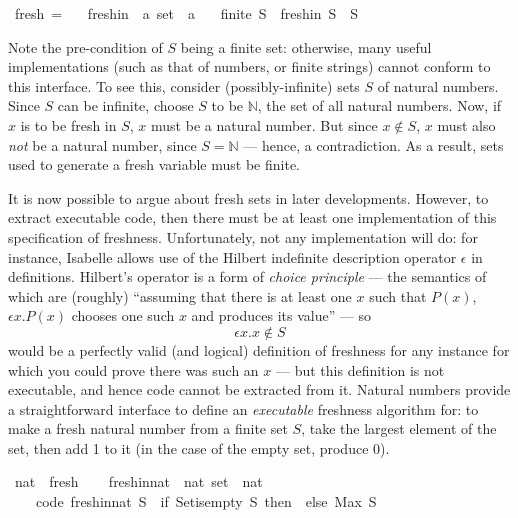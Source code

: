 \begin{implementation}
\isamarkupfalse%
\ fresh\ =\isanewline
\ \ \ fresh{\isacharunderscore}in\ {\isacharcolon}{\isacharcolon}\ {\isachardoublequoteopen}{\isacharprime}a\ set\ {\isasymRightarrow}\ {\isacharprime}a{\isachardoublequoteclose}\isanewline
\ \ \ {\isachardoublequoteopen}finite\ S\ {\isasymLongrightarrow}\ fresh{\isacharunderscore}in\ S\ {\isasymnotin}\ S{\isachardoublequoteclose}\isanewline
\end{implementation}

Note the pre-condition of \(S\) being a finite set: otherwise, many useful implementations (such as that of numbers, or finite strings) cannot conform to this interface.
To see this, consider (possibly-infinite) sets \(S\) of natural numbers.
Since \(S\) can be infinite, choose \(S\) to be \(\mathbb{N}\), the set of all natural numbers.
Now, if \(x\) is to be fresh in \(S\), \(x\) must be a natural number.
But since \(x \notin S\), \(x\) must also \emph{not} be a natural number, since \(S = \mathbb{N}\) --- hence, a contradiction.
As a result, sets used to generate a fresh variable must be finite.

It is now possible to argue about fresh sets in later developments.
However, to extract executable code, then there must be at least one implementation of this specification of freshness.
Unfortunately, not any implementation will do: for instance, Isabelle allows use of the Hilbert indefinite description operator \(\epsilon\) in definitions.
Hilbert's operator is a form of \emph{choice principle} --- the semantics of which are (roughly) ``assuming that there is at least one \(x\) such that \(P(x)\), \(\epsilon x. P(x)\) chooses one such \(x\) and produces its value'' --- so
\[
\epsilon x. x \notin S
\]
would be a perfectly valid (and logical) definition of freshness for any instance for which you could prove there was such an \(x\) --- but this definition is not executable, and hence code cannot be extracted from it.
Natural numbers provide a straightforward interface to define an \emph{executable} freshness algorithm for: to make a fresh natural number from a finite set \(S\), take the largest element of the set, then add 1 to it (in the case of the empty set, produce 0).

\begin{implementation}
\isamarkupfalse%
\ nat\ {\isacharcolon}{\isacharcolon}\ fresh\isanewline
{}\isanewline
\ \ \isamarkupfalse%
\ fresh{\isacharunderscore}in{\isacharunderscore}nat\ {\isacharcolon}{\isacharcolon}\ {\isachardoublequoteopen}nat\ set\ {\isasymRightarrow}\ nat{\isachardoublequoteclose}\ \isanewline
\ \ \ \ {\isacharbrackleft}code{\isacharbrackright}{\isacharcolon}\ {\isachardoublequoteopen}fresh{\isacharunderscore}in{\isacharunderscore}nat\ S\ {\isasymequiv}\ {\isacharparenleft}if\ Set{\isachardot}is{\isacharunderscore}empty\ S\ then\ {}\ else\ Max\ S\ {\isacharplus}\ {}{\isacharparenright}{\isachardoublequoteclose}\isanewline
\end{implementation}

